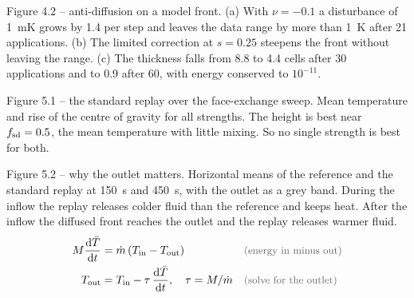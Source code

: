 \begin{qabox}{Figure 4.2 -- anti-diffusion on a model front.}
\explain (a) With $\nu=-0.1$ a disturbance of 1~mK grows by 1.4 per step and leaves the data range
by more than 1~K after 21 applications. (b) The limited correction at $s=0.25$ steepens the front
without leaving the range. (c) The thickness falls from 8.8 to 4.4 cells after 30 applications and to
0.9 after 60, with energy conserved to $10^{-11}$.
\end{qabox}

\begin{qabox}{Figure 5.1 -- the standard replay over the face-exchange sweep.}
\explain Mean temperature and rise of the centre of gravity for all strengths. The height is best
near $f_{\mathrm{sd}}=0.5$, the mean temperature with little mixing. So no single strength is best for both.
\end{qabox}

\begin{qabox}{Figure 5.2 -- why the outlet matters.}
\explain Horizontal means of the reference and the standard replay at 150~s and 450~s, with the
outlet as a grey band. During the inflow the replay releases colder fluid than the reference and
keeps heat. After the inflow the diffused front reaches the outlet and the replay releases warmer
fluid.
\derive
\begin{align*}
M\frac{\mathrm{d}\bar T}{\mathrm{d}t} &= \dot m\,(T_{\mathrm{in}} - T_{\mathrm{out}}) \why{energy in minus out} \\
T_{\mathrm{out}} &= T_{\mathrm{in}} - \tau\,\frac{\mathrm{d}\bar T}{\mathrm{d}t},\quad \tau = M/\dot m \why{solve for the outlet}
\end{align*}
\end{qabox}


